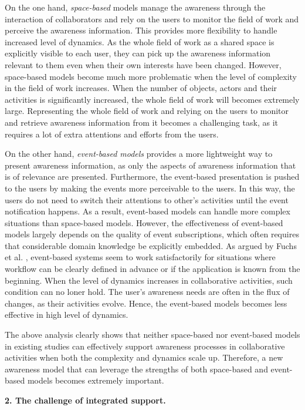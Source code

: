 On the one hand, \emph{space-based} models manage the awareness through the interaction of collaborators and rely on the users to monitor the field of work and perceive the awareness information. This provides more flexibility to handle increased level of dynamics. As the whole field of work as a shared space is explicitly visible to each user, they can pick up the awareness information relevant to them even when their own interests have been changed. However, space-based models become much more problematic when the level of complexity in the field of work increases. When the number of objects, actors and their activities is significantly increased, the whole field of work will becomes extremely large. Representing the whole field of work and relying on the users to monitor and retrieve awareness information from it becomes a challenging task, as it requires a lot of extra attentions and efforts from the users. 
 
On the other hand, \emph{event-based models} provides a more lightweight way to present awareness information, as only the aspects of awareness information that is of relevance are presented. Furthermore, the event-based presentation is pushed to the users by making the events more perceivable to the users. In this way, the users do not need to switch their attentions to other's activities until the event notification happens. As a result, event-based models can handle more complex situations than space-based models. However, the effectiveness of event-based models largely depends on the quality of event subscriptions, which often requires that considerable domain knowledge be explicitly embedded. As argued by Fuchs et al. \cite{fuchs1999a}, event-based systems seem to work satisfactorily for situations where workflow can be clearly defined in advance or if the application is known from the beginning. When the level of dynamics increases in collaborative activities, such condition can no loner hold. The user's awareness needs are often in the flux of changes, as their activities evolve. Hence, the event-based models becomes less effective in high level of dynamics.

The above analysis clearly shows that neither space-based nor event-based models in existing studies can effectively support awareness processes in collaborative activities when both the complexity and dynamics scale up. Therefore, a new awareness model that can leverage the strengths of both space-based and event-based models becomes extremely important.

\textbf{2. The challenge of integrated support.}

